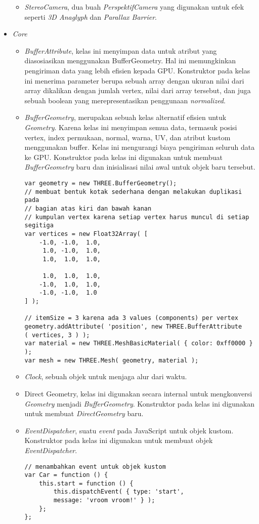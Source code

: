 \begin{itemize}
\begin{itemize}
	\item {\it StereoCamera}, dua buah {\it PerspektifCamera} yang digunakan untuk efek seperti {\it 3D Anaglyph} dan {\it Parallax Barrier}.

	\end{itemize}
	
\item \textit{Core}
	\begin{itemize}
	\item{\it BufferAttribute}, kelas ini menyimpan data untuk atribut yang diasosiasikan menggunakan BufferGeometry. Hal ini memungkinkan pengiriman data yang lebih efisien kepada GPU. Konstruktor pada kelas ini menerima parameter berupa sebuah array dengan ukuran nilai dari array dikalikan dengan jumlah vertex, nilai dari array tersebut, dan juga sebuah boolean yang merepresentasikan penggunaan {\it normalized}.
	\item{\it BufferGeometry}, merupakan sebuah kelas alternatif efisien untuk {\it Geometry}. Karena kelas ini menyimpan semua data, termasuk posisi vertex, index permukaan, normal, warna, UV, dan atribut kustom menggunakan buffer. Kelas ini mengurangi biaya pengiriman seluruh data ke GPU. Konstruktor pada kelas ini digunakan untuk membuat {\it BufferGeometry} baru dan inisialisasi nilai awal untuk objek baru tersebut.
\begin{lstlisting}[caption={Contoh instansiasi kelas {\it BufferGeometry} dengan membuat bentuk kotak sederhana.},captionpos=b]
var geometry = new THREE.BufferGeometry();
// membuat bentuk kotak sederhana dengan melakukan duplikasi pada
// bagian atas kiri dan bawah kanan
// kumpulan vertex karena setiap vertex harus muncul di setiap segitiga
var vertices = new Float32Array( [
	-1.0, -1.0,  1.0,
	 1.0, -1.0,  1.0,
	 1.0,  1.0,  1.0,

	 1.0,  1.0,  1.0,
	-1.0,  1.0,  1.0,
	-1.0, -1.0,  1.0
] );

// itemSize = 3 karena ada 3 values (components) per vertex
geometry.addAttribute( 'position', new THREE.BufferAttribute
( vertices, 3 ) );
var material = new THREE.MeshBasicMaterial( { color: 0xff0000 } );
var mesh = new THREE.Mesh( geometry, material );
\end{lstlisting}

	\item{\it Clock}, sebuah objek untuk menjaga alur dari waktu.
	\item{Direct Geometry}, kelas ini digunakan secara internal untuk mengkonversi {\it Geometry} menjadi {\it BufferGeometry}. Konstruktor pada kelas ini digunakan untuk membuat {\it DirectGeometry} baru.
	\item{\it EventDispatcher}, suatu {\it event} pada JavaScript untuk objek kustom. Konstruktor pada kelas ini digunakan untuk membuat objek {\it EventDispatcher}.
\begin{lstlisting}[caption={Contoh penggunaan objek {\it EventDispatcher} untuk objek kustom.},captionpos=b]
// menambahkan event untuk objek kustom
var Car = function () {
    this.start = function () {
        this.dispatchEvent( { type: 'start',
        message: 'vroom vroom!' } );
    };
};


\end{lstlisting}
\end{itemize}
\end{itemize}
